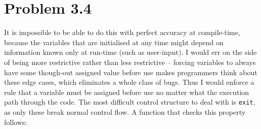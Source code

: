 \section{Problem 3.4}
It is impossible to be able to do this with perfect accuracy at compile-time, because the variables that are initialised at any time might depend on information known only at run-time (such as user-input). I would err on the side of being more restrictive rather than less restrictive -- forcing variables to always have some though-out assigned value before use makes programmers think about these edge cases, which eliminates a whole class of bugs. Thus I would enforce a rule that a variable must be assigned before use no matter what the execution path through the code. The most difficult control structure to deal with is \texttt{exit}, as only these break normal control flow. A function that checks this property follows:


